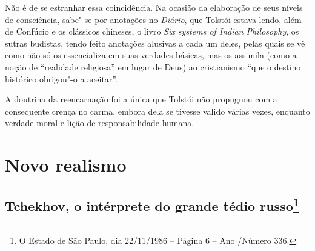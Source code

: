 Não é de se estranhar essa coincidência. Na ocasião da elaboração de seus
níveis de consciência, sabe"-se por anotações no \emph{Diário}, que Tolstói estava lendo, além de Confúcio e os
clássicos chineses, o livro \emph{Six systems of Indian
Philosophy}, os sutras budistas, tendo feito anotações alusivas
a cada um deles, pelas quais se vê como não só os essencializa em suas
verdades básicas, mas os assimila (como a noção de ``realidade
religiosa'' em lugar de Deus) ao cristianismo ``que o destino histórico
obrigou"-o a aceitar''.

A doutrina da reencarnação foi a única que Tolstói não propugnou com a
consequente crença no carma, embora dela se tivesse valido
várias vezes, enquanto verdade moral e lição de responsabilidade humana.


\part{Novo realismo}

\chapter{Tchekhov, o intérprete do grande tédio russo\footnote{O Estado
  de São Paulo, dia 22/11/1986 -- Página 6 -- Ano /Número 336.}}

